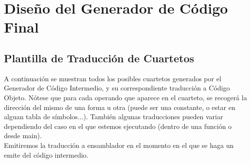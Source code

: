 \documentclass{article}[a4paper]
\begin{document}
\newpage

\section{Diseño del Generador de Código Final}

\subsection{Plantilla de Traducción de Cuartetos}

A continuación se muestran todos los posibles cuartetos generados por el Generador de Código Intermedio, y su correspondiente traducción a Código Objeto. Nótese que para cada operando que aparece en el cuarteto, se recogerá la dirección del mismo de una forma u otra (puede ser una constante, o estar en alguan tabla de símbolos...). También algunas traducciones pueden variar dependiendo del caso en el que estemos ejecutando (dentro de una función o desde main).\\

Emitiremos la traducción a ensamblador en el momento en el que se haga un emite del código intermedio.
\end{document}
